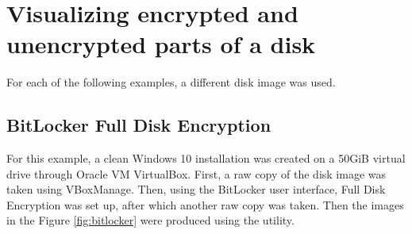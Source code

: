 \documentclass[
  digital, %
  color,   %
  oneside, %
  lof,     %
  nolot,     %
]{fithesis4}
\begin{document}
\section{Visualizing encrypted and unencrypted parts of a disk}
\label{sec:visualizing-encrypted-and-unencrypted-parts-of-a-disk}

For each of the following examples, a different disk image was used.

\subsection{BitLocker Full Disk Encryption}
\label{ssec:bitlocker-full-disk-encryption}

For this example, a clean Windows 10 installation was created on a 50GiB virtual drive through Oracle VM VirtualBox.
First, a raw copy of the disk image was taken using VBoxManage.
Then, using the BitLocker user interface, Full Disk Encryption was set up, after which another raw copy was taken.
Then the images in the Figure \ref{fig:bitlocker} were produced using the utility.
\end{document}
